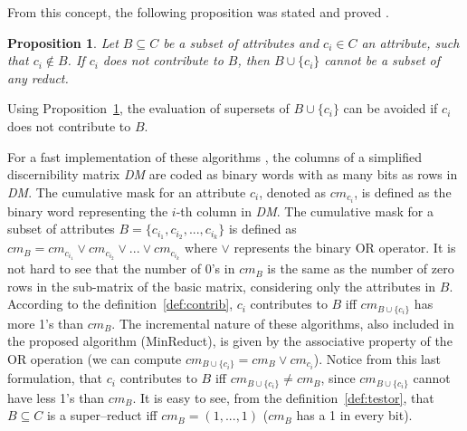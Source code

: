 \documentclass[authoryear,preprint,review,12pt]{elsarticle}
\newtheorem{proposition}{Proposition}
\newtheorem{corollary}{Corollary}
\begin{document}
	From this concept, the following proposition was stated and proved \cite{Sanchez07}.
			
	\begin{proposition}\label{prop:contrib} 
		Let $B \subseteq C$ be a subset of attributes and $c_i \in C$ an attribute, such that $c_i \notin B$. If $c_i$ does not contribute to $B$, then $B\cup\{c_i\}$ cannot be a subset of any reduct.
	\end{proposition}
	
	Using Proposition~\ref{prop:contrib}, the evaluation of supersets of $B\cup\{c_i\}$ can be avoided if $c_i$ does not contribute to $B$.
	
	
	For a fast implementation of these algorithms \citep{Sanchez10,Lias13}, the columns of a simplified discernibility matrix \textit{DM} are coded as binary words with as many bits as rows in \textit{DM}. The cumulative mask for an attribute $c_i$, denoted as $cm_{c_i}$, is defined as the binary word representing the $i$-th column in \textit{DM}. The cumulative mask for a subset of attributes $B=\lbrace c_{i_1},c_{i_2},...,c_{i_k} \rbrace$ is defined	as $cm_B = cm_{c_{i_1}} \vee cm_{c_{i_2}} \vee ... \vee cm_{c_{i_k}}$ where $\vee$ represents the binary OR operator. It is not hard to see that the number of 0's in $cm_B$ is the same as the number of zero rows in the sub-matrix of the basic matrix, considering only the attributes in $B$. According to the definition~\ref{def:contrib}, $c_i$ contributes to $B$ iff $cm_{B\cup \lbrace c_i\rbrace}$ has more 1's than $cm_B$. The incremental nature of these algorithms, also included in  the proposed algorithm (MinReduct), is given by the associative property of the OR operation (we can compute $cm_{B\cup \lbrace c_i\rbrace}=cm_B\vee cm_{c_i}$). Notice from this last formulation, that $c_i$ contributes to $B$ iff $cm_{B\cup \lbrace c_i\rbrace}\neq cm_B$, since $cm_{B\cup \lbrace c_i\rbrace}$ cannot have less 1's than $cm_B$. It is easy to see, from the definition~\ref{def:testor}, that $B \subseteq C$ is a super--reduct iff $cm_B=(1,...,1)$ ($cm_B$ has a 1 in every bit).
	
\end{document}
